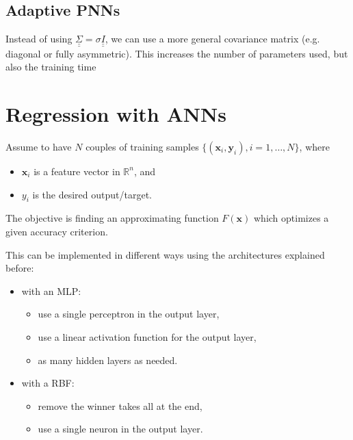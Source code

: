 \documentclass[oneside,onecolumn]{report}
\begin{document}
\subsection{Adaptive PNNs}
Instead of using $\underline{\underline{\Sigma}} = \sigma \underline{\underline{I}}$, we can use a more general covariance matrix (e.g. diagonal or fully asymmetric).
This increases the number of parameters used, but also the training time



\section{Regression with ANNs}
Assume to have $N$ couples of training samples $\{ (\bm x_i, \bm y_i), i = 1, \dots, N\}$, where
\begin{itemize}
    \item $\bm x_i$ is a feature vector in $\mathbb R^n$, and
    \item $y_i$ is the desired output/target.
\end{itemize}

The objective is finding an approximating function $F(\bm x)$ which optimizes a given accuracy criterion.

This can be implemented in different ways using the architectures explained before:
\begin{itemize}
    \item with an MLP:
    \begin{itemize}
        \item use a single perceptron in the output layer,
        \item use a linear activation function for the output layer,
        \item as many hidden layers as needed.
    \end{itemize}

    \item with a RBF:
    \begin{itemize}
        \item remove the winner takes all at the end,
        \item use a single neuron in the output layer.
    \end{itemize}
\end{itemize}
\end{document}

